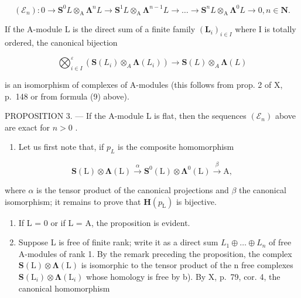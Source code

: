 \[
\left(\mathcal {E} _ {n}\right): 0 \rightarrow \mathbf {S} ^ {0} L \otimes_ {\mathrm{A}} \boldsymbol {\Lambda} ^ {n} L \rightarrow \mathbf {S} ^ {1} L \otimes_ {\mathrm{A}} \boldsymbol {\Lambda} ^ {n - 1} L \rightarrow \dots \rightarrow \mathbf {S} ^ {n} L \otimes_ {\mathrm{A}} \boldsymbol {\Lambda} ^ {0} L \rightarrow 0, n \in \mathbf {N}.
\]

If the A-module L is the direct sum of a finite family \((\mathbf{L}_{i})_{i\in I}\) where I is totally ordered, the canonical bijection

\[
\bigotimes_ {i \in I} ^ {\varepsilon} \left(\mathbf {S} (L _ {i}) \otimes_ {A} \boldsymbol {\Lambda} (L _ {i})\right) \to \mathbf {S} (L) \otimes_ {A} \boldsymbol {\Lambda} (L)
\]

is an isomorphism of complexes of A-modules (this follows from prop. 2 of X, p.~148 or from formula (9) above).

PROPOSITION 3. --- If the A-module L is flat, then the sequences \((\mathcal{E}_n)\) above are exact for \(n > 0\) .

\begin{enumerate}
\def\labelenumi{\alph{enumi})}
\tightlist
\item
  Let us first note that, if \(p_{L}\) is the composite homomorphism
\end{enumerate}

\[
\mathbf {S} (\mathrm{L}) \otimes \boldsymbol {\Lambda} (\mathrm{L}) \xrightarrow {\alpha} \mathbf {S} ^ {0} (\mathrm{L}) \otimes \boldsymbol {\Lambda} ^ {0} (\mathrm{L}) \xrightarrow {\beta} \mathrm{A},
\]

where \(\alpha\) is the tensor product of the canonical projections and \(\beta\) the canonical isomorphism; it remains to prove that \(\mathbf{H}(p_{\mathrm{L}})\) is bijective.

\begin{enumerate}
\def\labelenumi{\alph{enumi})}
\setcounter{enumi}{1}
\item
  If L = 0 or if L = A, the proposition is evident.
\item
  Suppose L is free of finite rank; write it as a direct sum \(L_{1} \oplus \ldots \oplus L_{n}\) of free A-modules of rank 1. By the remark preceding the proposition, the complex \(\mathbf{S}(\mathrm{L}) \otimes \symbf{\Lambda}(\mathrm{L})\) is isomorphic to the tensor product of the n free complexes \(\mathbf{S}(\mathrm{L}_{i}) \otimes \symbf{\Lambda}(\mathrm{L}_{i})\) whose homology is free by b). By X, p.~79, cor. 4, the canonical homomorphism
\end{enumerate}


